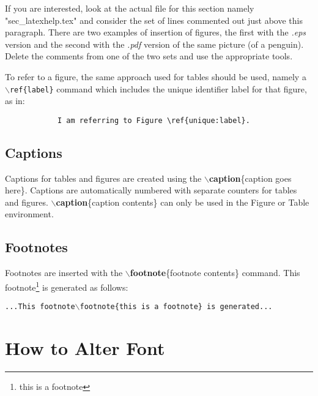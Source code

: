If you are interested, look at the actual file for this section namely "sec\_latexhelp.tex"
and consider the set of lines commented out just above this paragraph. There are two examples of insertion of figures, the first with the
\textit{.eps} version and the second with the \textit{.pdf} version of the same picture (of a penguin). Delete the comments from one of the two sets and use the appropriate tools.

To refer to a figure, the same approach used for tables should be used, namely a \texttt{$\backslash$ref\{label\}} command 
which includes the unique identifier label for that figure, as
in:
\begin{verbatim}
            I am referring to Figure \ref{unique:label}.
\end{verbatim}

\subsection{Captions}
 Captions for tables and figures are created using the \textbf{$\backslash$caption}\{caption goes here\}. Captions are automatically numbered with separate counters for tables and figures. \textbf{$\backslash$caption}\{caption contents\} can only be used in the Figure or Table environment.

\subsection{Footnotes}
 Footnotes are inserted with the \textbf{$\backslash$footnote}\{footnote contents\} command.  This footnote\footnote{this is a footnote} is generated as follows:
 \begin{center}
    \texttt{...This footnote$\backslash$footnote\{this is a footnote\} is generated...}
 \end{center}

\section{How to Alter Font}
